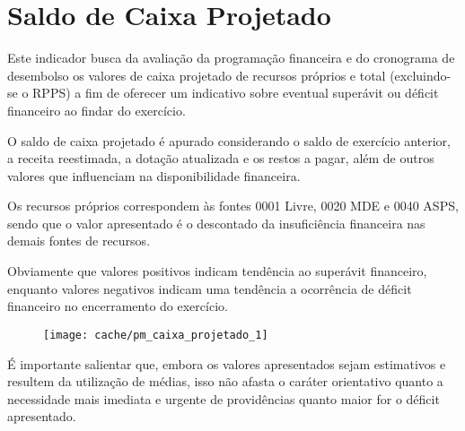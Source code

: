 
\section[Saldo de Caixa Projetado]{Saldo de Caixa Projetado}

Este indicador busca da avaliação da programação financeira e do cronograma de desembolso os valores de caixa projetado de recursos próprios e total (excluindo-se o RPPS) a fim de oferecer um indicativo sobre eventual superávit ou déficit financeiro ao findar do exercício.

O saldo de caixa projetado é apurado considerando o saldo de exercício anterior, a receita reestimada, a dotação atualizada e os restos a pagar, além de outros valores que influenciam na disponibilidade financeira.

Os recursos próprios correspondem às fontes 0001 Livre, 0020 MDE e 0040 ASPS, sendo que o valor apresentado é o descontado da insuficiência financeira nas demais fontes de recursos.



Obviamente que valores positivos indicam tendência ao superávit financeiro, enquanto valores negativos indicam uma tendência a ocorrência de déficit financeiro no encerramento do exercício.


\begin{figure}[H]
\center
\texttt{[image: cache/pm\_caixa\_projetado\_1]}
\end{figure}

É importante salientar que, embora os valores apresentados sejam estimativos e resultem da utilização de médias, isso não afasta o caráter orientativo quanto a necessidade mais imediata e urgente de providências quanto maior for o déficit apresentado.